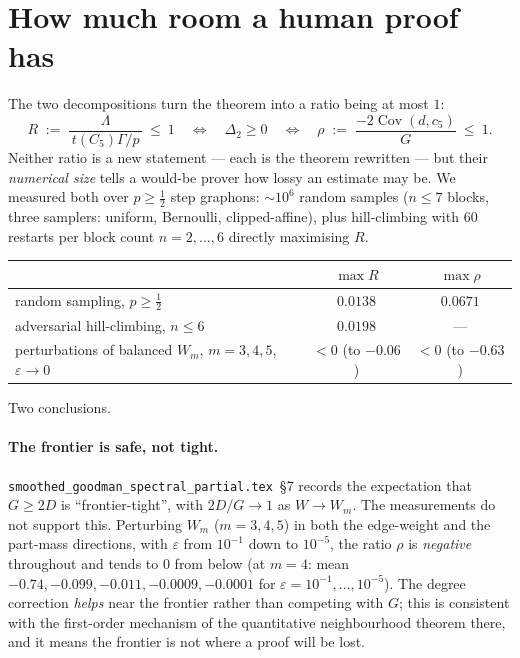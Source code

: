 \documentclass[11pt]{article}
\theoremstyle{definition}
\newcommand{\Cov}{\operatorname{Cov}}
\begin{document}
\section{How much room a human proof has}\label{sec:landscape}

The two decompositions turn the theorem into a ratio being at most $1$:
\[
  R\;:=\;\frac{\Lambda}{\,t(C_5)\Gamma/p\,}\ \le\ 1
  \quad\Longleftrightarrow\quad \Delta_2\ge0
  \quad\Longleftrightarrow\quad
  \rho\;:=\;\frac{-2\Cov(d,c_5)}{G}\ \le\ 1 .
\]
Neither ratio is a new statement --- each is the theorem rewritten --- but their
\emph{numerical size} tells a would-be prover how lossy an estimate may be.  We
measured both over $p\ge\tfrac12$ step graphons: ${\sim}10^6$ random samples
($n\le7$ blocks, three samplers: uniform, Bernoulli, clipped-affine), plus
hill-climbing with $60$ restarts per block count $n=2,\dots,6$ directly
maximising $R$.

\begin{center}
\begin{tabular}{lcc}
\toprule
& $\max R$ & $\max\rho$\\
\midrule
random sampling, $p\ge\tfrac12$        & $0.0138$ & $0.0671$\\
adversarial hill-climbing, $n\le6$     & $0.0198$ & ---\\
perturbations of balanced $W_m$, $m=3,4,5$, $\varepsilon\to0$
                                       & $<0$ (to $-0.06$) & $<0$ (to $-0.63$)\\
\bottomrule
\end{tabular}
\end{center}

Two conclusions.

\paragraph{The frontier is safe, not tight.}
\texttt{smoothed\_goodman\_spectral\_partial.tex}~\S7 records the expectation
that $G\ge2D$ is ``frontier-tight'', with $2D/G\to1$ as $W\to W_m$.  The
measurements do not support this.  Perturbing $W_m$ ($m=3,4,5$) in both the
edge-weight and the part-mass directions, with $\varepsilon$ from $10^{-1}$ down
to $10^{-5}$, the ratio $\rho$ is \emph{negative} throughout and tends to $0$
from below (at $m=4$: mean $-0.74,-0.099,-0.011,-0.0009,-0.0001$ for
$\varepsilon=10^{-1},\dots,10^{-5}$).  The degree correction \emph{helps} near
the frontier rather than competing with $G$; this is consistent with the
first-order mechanism of the quantitative neighbourhood theorem there, and it
means the frontier is not where a proof will be lost.
\end{document}
